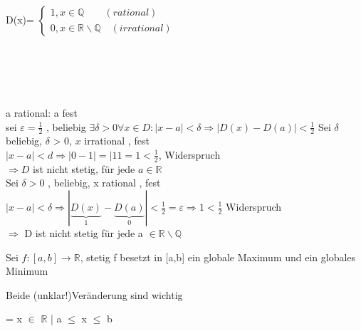 \begin{example}
	D(x)=  
$	\begin{cases}
		1, x \in \mathbb{Q} \quad \quad (rational)\\		
		0, x \in \mathbb{R} \backslash \mathbb{Q} \quad (irrational) 	
	\end{cases}$\\ \\
\\
 \\ 
\\ \\ a rational: a fest 
\\ sei $\varepsilon = \frac{1}{2}$ , beliebig  $\exists \delta > 0 \forall x \in D: |x-a| < \delta \Rightarrow |D(x) -D(a) | < \frac{1}{2}$ 
Sei $\delta$ beliebig, $\delta$ > 0, $x$ irrational , fest \\
$|x-a|<d \Rightarrow |0-1| =|11= 1 < \frac{1}{2}$, Widerspruch \\
$\Rightarrow D$ ist nicht stetig, für jede $ a \in \mathbb{R}$  \\
Sei $\delta >0$ , beliebig, x rational , fest $|x-a| < \delta \Rightarrow |\underbrace{D(x)}_1 -\underbrace{D(a)}_0| < \frac{1}{2}= \varepsilon \Rightarrow 1 < \frac{1}{2} $ Widerspruch \\
$\Rightarrow$ D ist nicht stetig für jede a $\in \mathbb{R} \backslash \mathbb{Q}$ 
\end{example}
\begin{theorem}
Sei $ f: [a,b] \rightarrow \mathbb{R}$, stetig 
f besetzt in [a,b] ein globale Maximum und ein globales Minimum
\end{theorem}
\begin{remark}
Beide (unklar!)Veränderung sind wichtig
\end{remark}
\begin{remark}
	[a,k]= {x $\in$ $\mathbb{R}$ | a $\leq$ x $\leq$ b}
\end{remark}
